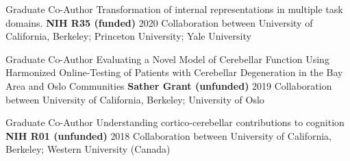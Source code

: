 

\begin{cventries}

  \cventry
    {Graduate Co-Author} %
    {Transformation of internal representations in multiple task domains.} %
    {\textbf{NIH R35 (funded)}} %
    {2020} %
    {Collaboration between University of California, Berkeley; Princeton University; Yale University}

  \cventry
    {Graduate Co-Author} %
    {Evaluating a Novel Model of Cerebellar Function Using Harmonized Online-Testing of Patients with Cerebellar Degeneration in the Bay Area and Oslo Communities} %
    {\textbf{Sather Grant (unfunded)}} %
    {2019} %
    {Collaboration between University of California, Berkeley; University of Oslo}
    
  \cventry
    {Graduate Co-Author} %
    {Understanding cortico-cerebellar contributions to cognition} %
    {\textbf{NIH R01 (unfunded)}} %
    {2018} %
    {Collaboration between University of California, Berkeley; Western University (Canada)}
    

\end{cventries}